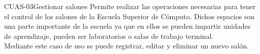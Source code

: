 \begin{UseCase}{CUAS-03}{Gestionar salones}{
	Permite realizar las operaciones necesarias para tener el control de los salones de la Escuela Superior de Cómputo. Dichos espacios son una parte importante de la escuela ya que en ellos se pueden impartir unidades de aprendizaje, pueden ser laboratorios o salas de trabajo terminal. \\
	Mediante este caso de uso se puede registrar, editar y eliminar un nuevo salón.
    }


%			


\end{UseCase}
